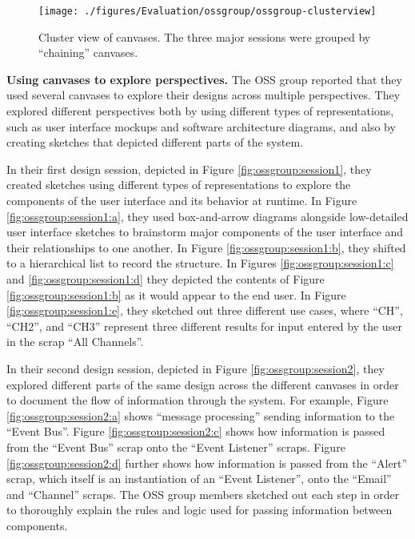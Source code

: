 \documentclass[12pt,fleqn]{ucithesis}
\begin{document}
\begin{figure}%
  \centering
  \texttt{[image: ./figures/Evaluation/ossgroup/ossgroup-clusterview]}
   \caption {Cluster view of canvases. The three major sessions were grouped by ``chaining'' canvases.}
   \label{fig:ossgroup:clusterview}   
\end{figure}%

\textbf{Using canvases to explore perspectives.} The OSS group reported that they used several canvases to explore their designs across multiple perspectives. They explored different perspectives both by using different types of representations, such as user interface mockups and software architecture diagrams, and also by creating sketches that depicted different parts of the system. 

In their first design session, depicted in Figure \ref{fig:ossgroup:session1}, they created sketches using different types of representations to explore the components of the user interface and its behavior at runtime. In Figure \ref{fig:ossgroup:session1:a}, they used box-and-arrow diagrams alongside low-detailed user interface sketches to brainstorm major components of the user interface and their relationships to one another. In Figure \ref{fig:ossgroup:session1:b}, they shifted to a hierarchical list to record the structure. In Figures \ref{fig:ossgroup:session1:c} and \ref{fig:ossgroup:session1:d} they depicted the contents of Figure \ref{fig:ossgroup:session1:b} as it would appear to the end user. In Figure \ref{fig:ossgroup:session1:e}, they sketched out three different use cases, where ``CH'', ``CH2'', and ``CH3'' represent three different results for input entered by the user in the scrap ``All Channels''.

In their second design session, depicted in Figure \ref{fig:ossgroup:session2}, they explored different parts of the same design across the different canvases in order to document the flow of information through the system. For example, Figure \ref{fig:ossgroup:session2:a} shows ``message processing'' sending information to the ``Event Bus''. Figure \ref{fig:ossgroup:session2:c} shows how information is passed from the ``Event Bus'' scrap onto the ``Event Listener'' scraps. Figure \ref{fig:ossgroup:session2:d} further shows how information is passed from the ``Alert'' scrap, which itself is an instantiation of an ``Event Listener'', onto the ``Email'' and ``Channel'' scraps. The OSS group members sketched out each step in order to thoroughly explain the rules and logic used for passing information between components. 
\end{document}
